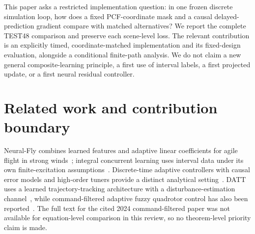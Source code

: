 \documentclass[11pt]{article}
\begin{document}
This paper asks a restricted implementation question: in one frozen discrete simulation loop, how does a fixed PCF-coordinate mask and a causal delayed-prediction gradient compare with matched alternatives? We report the complete TEST48 comparison and preserve each scene-level loss. The relevant contribution is an explicitly timed, coordinate-matched implementation and its fixed-design evaluation, alongside a conditional finite-path analysis. We do not claim a new general composite-learning principle, a first use of interval labels, a first projected update, or a first neural residual controller.

\section{Related work and contribution boundary}
Neural-Fly combines learned features and adaptive linear coefficients for agile flight in strong winds~\cite{oconnell2022neuralfly}; integral concurrent learning uses interval data under its own finite-excitation assumptions~\cite{parikh2019integral}. Discrete-time adaptive controllers with causal error models and high-order tuners provide a distinct analytical setting~\cite{fisher2023discrete}. DATT uses a learned trajectory-tracking architecture with a disturbance-estimation channel~\cite{huang2023datt}, while command-filtered adaptive fuzzy quadrotor control has also been reported~\cite{zhao2024commandfilter}. The full text for the cited 2024 command-filtered paper was not available for equation-level comparison in this review, so no theorem-level priority claim is made.
\end{document}
